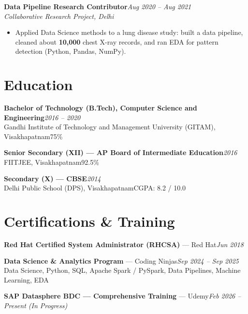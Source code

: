 \documentclass[10pt, letterpaper]{article}
\newcommand{\role}[3]{%
  \vspace{2pt}%
  {\bfseries #1}\hfill{\small\color{muted}\textit{#3}}\\[-2pt]%
  {\small\color{muted}\textit{#2}}%
}
\begin{document}
\vspace{1pt}

\role{Data Pipeline Research Contributor}{Collaborative Research Project, Delhi}{Aug 2020 -- Aug 2021}

\begin{itemize}
  \item Applied Data Science methods to a lung disease study: built a data pipeline, cleaned about \textbf{10,000} chest X-ray records, and ran EDA for pattern detection (Python, Pandas, NumPy).
\end{itemize}

\section{Education}

{\bfseries Bachelor of Technology (B.Tech), Computer Science and Engineering}\hfill{\small\color{muted}\textit{2016 -- 2020}}\\
{\small\color{muted}Gandhi Institute of Technology and Management University (GITAM), Visakhapatnam\hfill 75\%}

\vspace{2pt}
{\bfseries Senior Secondary (XII) --- AP Board of Intermediate Education}\hfill{\small\color{muted}\textit{2016}}\\
{\small\color{muted}FIITJEE, Visakhapatnam\hfill 92.5\%}

\vspace{2pt}
{\bfseries Secondary (X) --- CBSE}\hfill{\small\color{muted}\textit{2014}}\\
{\small\color{muted}Delhi Public School (DPS), Visakhapatnam\hfill CGPA: 8.2 / 10.0}

\section{Certifications \& Training}

{\bfseries Red Hat Certified System Administrator (RHCSA)} --- Red Hat\hfill{\small\color{muted}\textit{Jun 2018}}

\vspace{1pt}
{\bfseries Data Science \& Analytics Program} --- Coding Ninjas\hfill{\small\color{muted}\textit{Sep 2024 -- Sep 2025}}\\
{\small\color{muted}Data Science, Python, SQL, Apache Spark / PySpark, Data Pipelines, Machine Learning, EDA}

\vspace{1pt}
{\bfseries SAP Datasphere BDC --- Comprehensive Training} --- Udemy\hfill{\small\color{muted}\textit{Feb 2026 -- Present \emph{(In Progress)}}}

\end{document}
